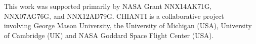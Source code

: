 	This work was supported primarily by NASA Grant NNX14AK71G, NNX07AG76G, and NNX12AD79G.
	CHIANTI is a collaborative project involving George Mason University, the University of Michigan (USA), University of Cambridge (UK) and NASA Goddard Space Flight Center (USA).
	